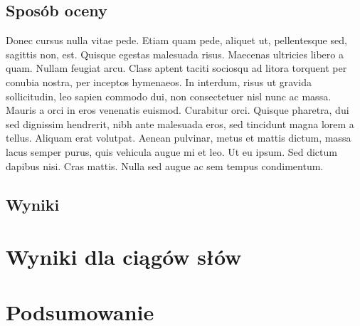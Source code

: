\documentclass[eng,printmode]{mgr}
\begin{document}
 \section{Sposób oceny}
Donec cursus nulla vitae pede. Etiam quam pede, aliquet ut, pellentesque sed, sagittis non, est. Quisque egestas malesuada risus. Maecenas ultricies libero a quam. Nullam feugiat arcu. Class aptent taciti sociosqu ad litora torquent per conubia nostra, per inceptos hymenaeos. In interdum, risus ut gravida sollicitudin, leo sapien commodo dui, non consectetuer nisl nunc ac massa. Mauris a orci in eros venenatis euismod. Curabitur orci. Quisque pharetra, dui sed dignissim hendrerit, nibh ante malesuada eros, sed tincidunt magna lorem a tellus. Aliquam erat volutpat. Aenean pulvinar, metus et mattis dictum, massa lacus semper purus, quis vehicula augue mi et leo. Ut eu ipsum. Sed dictum dapibus nisi. Cras mattis. Nulla sed augue ac sem tempus condimentum. 
 \section{Wyniki}

\chapter{Wyniki dla ciągów słów}

\chapter{Podsumowanie}

%


 \listoffigures
 \listoftables
\end{document}
